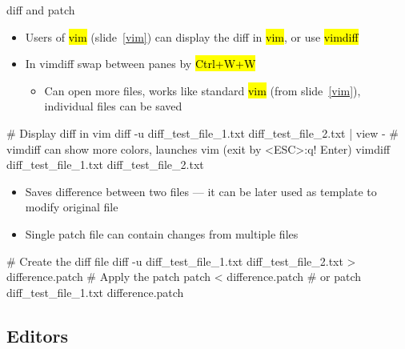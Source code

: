 \documentclass[compress, ucs, xelatex, 11pt, xcolor=svgnames, aspectratio=169,
	hyperref={
		bookmarks=true,
		unicode=true,
		colorlinks=true,
		pdftitle={Linux, command line and MetaCentrum},
		plainpages=false,
		pdfauthor={Vojtech Zeisek},
		pdfsubject={Course about use of Linux command line, writing shell scripts and using MetaCentrum of CESNET},
		pdfcreator={XeLaTeX},
		pdfkeywords={Linux, GNU, BASH, shell, command line, MetaCentrum},
		linkcolor=DarkRed, %
		anchorcolor=DarkBlue, %
		citecolor=Indigo, %
		filecolor=NavyBlue, %
		menucolor=DarkMagenta, %
		urlcolor=DarkBlue, %
		pdftex},
	url={hyphens, lowtilde} %
	]{beamer}
\renewcommand{\texttt}[1]{\hl{\ttfamily #1}}
\begin{document}
\begin{frame}[fragile]{diff and patch}
	\begin{itemize}
		\item Users of \texttt{vim} (slide~\ref{vim}) can display the diff in \texttt{vim}, or use \texttt{vimdiff}
		\item In vimdiff swap between panes by \texttt{Ctrl+W+W}
		\begin{itemize}
			\item Can open more files, works like standard \texttt{vim} (from slide~\ref{vim}), individual files can be saved
		\end{itemize}
	\end{itemize}
	\vfill
	\begin{bashcode}
    # Display diff in vim
    diff -u diff_test_file_1.txt diff_test_file_2.txt | view -
    # vimdiff can show more colors, launches vim (exit by <ESC>:q! Enter)
    vimdiff diff_test_file_1.txt diff_test_file_2.txt
	\end{bashcode}
	\vfill
	\begin{itemize}
		\item Saves difference between two files --- it can be later used as template to modify original file
		\item Single patch file can contain changes from multiple files
	\end{itemize}
	\vfill
	\begin{bashcode}
    # Create the diff file
    diff -u diff_test_file_1.txt diff_test_file_2.txt > difference.patch
    # Apply the patch
    patch < difference.patch # or
    patch diff_test_file_1.txt difference.patch
	\end{bashcode}
\end{frame}

\subsection{Editors}
\end{document}
